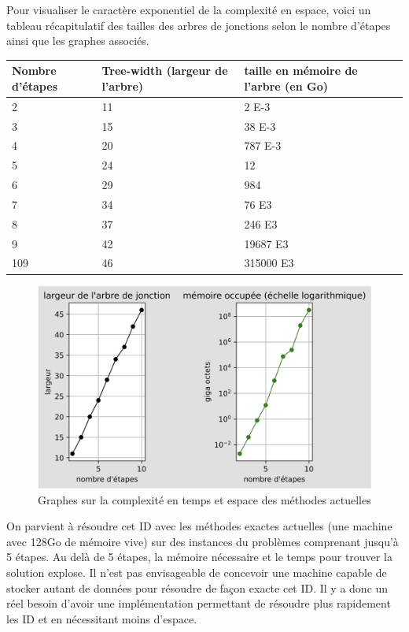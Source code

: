 \documentclass[12pt]{article}
\begin{document}
\pagebreak
Pour visualiser le caractère exponentiel de la complexité en espace, voici un tableau récapitulatif des tailles des arbres de jonctions selon le nombre d'étapes ainsi que les graphes associés.
\bigbreak
\begin{center}
   \begin{tabular}{|p{3cm} || p{3cm} | p{3cm} | }
    \hline
    Nombre d'étapes & Tree-width (largeur de l'arbre) & taille en mémoire de l'arbre (en Go) \\ 
    \hline
    2&11&2 E-3\\
    \hline
    3&15&38 E-3\\
    \hline
    4&20&787 E-3\\
    \hline
    5&24&12\\
    \hline
    6&29&984\\
    \hline
    7&34&76 E3\\
    \hline
    8&37&246 E3\\
    \hline
    9&42&19687 E3\\
    \hline
    109&46&315000 E3\\
    \hline
   \end{tabular}
\end{center}
 \begin{figure}[h]
\centering
\includegraphics[scale=0.2]{docs/graphes.png}
\caption{Graphes sur la complexité en temps et espace des méthodes actuelles}
\end{figure}

On parvient à résoudre cet ID avec les méthodes exactes actuelles (une machine avec 128Go de mémoire vive) sur des instances du problèmes comprenant jusqu'à 5 étapes. Au delà de 5 étapes, la mémoire nécessaire et le temps pour trouver la solution explose. \bigbreak
Il n'est pas envisageable de concevoir une machine capable de stocker autant de données pour résoudre de façon exacte cet ID. Il y a donc un réel besoin d'avoir une implémentation permettant de résoudre plus rapidement les ID et en nécessitant moins d'espace.
\bigbreak
\bigbreak
\end{document}
